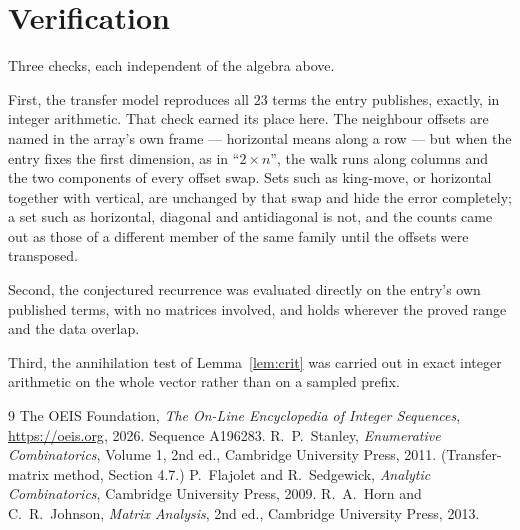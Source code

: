 \documentclass[11pt,a4paper]{article}
\theoremstyle{plain}
\theoremstyle{definition}
\begin{document}
\section{Verification}

Three checks, each independent of the algebra above.

First, the transfer model reproduces all $23$ terms the entry publishes, exactly, in
integer arithmetic. That check earned its place here. The neighbour offsets are named in the
array's own frame --- horizontal means along a row --- but when the entry fixes the first
dimension, as in ``$2\times n$'', the walk runs along columns and the two components of every
offset swap. Sets such as king-move, or horizontal together with vertical, are unchanged by
that swap and hide the error completely; a set such as horizontal, diagonal and antidiagonal
is not, and the counts came out as those of a different member of the same family until the
offsets were transposed.

Second, the conjectured recurrence was evaluated directly on the entry's own published terms,
with no matrices involved, and holds wherever the proved range and the data overlap.

Third, the annihilation test of Lemma~\ref{lem:crit} was carried out in exact integer
arithmetic on the whole vector rather than on a sampled prefix.

\begin{thebibliography}{9}
 The OEIS Foundation, \emph{The On-Line Encyclopedia of Integer
Sequences}, \url{https://oeis.org}, 2026. Sequence A196283.
 R.~P.~Stanley, \emph{Enumerative Combinatorics}, Volume 1, 2nd ed.,
Cambridge University Press, 2011. (Transfer-matrix method, Section 4.7.)
 P.~Flajolet and R.~Sedgewick, \emph{Analytic Combinatorics}, Cambridge
University Press, 2009.
 R.~A.~Horn and C.~R.~Johnson, \emph{Matrix Analysis}, 2nd ed., Cambridge
University Press, 2013.
\end{thebibliography}
\end{document}
